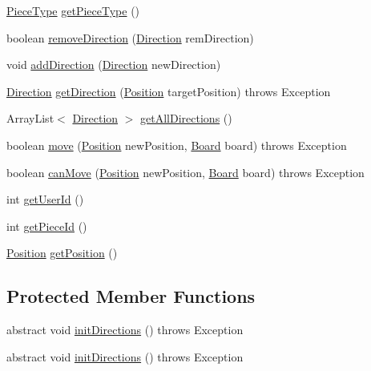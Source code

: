 \begin{DoxyCompactItemize}
\item 
\hyperlink{enumPiece_1_1PieceType}{Piece\-Type} \hyperlink{classPiece_1_1Piece_abe02eb4013ec562dfad1056245088add}{get\-Piece\-Type} ()
\item 
boolean \hyperlink{classPiece_1_1Piece_a472ffe2c12ba2a9d2d4a73e38c3f8d7f}{remove\-Direction} (\hyperlink{classUtil_1_1Direction}{Direction} rem\-Direction)
\item 
void \hyperlink{classPiece_1_1Piece_ab292128370c9df7d112cc7972bb8b1d0}{add\-Direction} (\hyperlink{classUtil_1_1Direction}{Direction} new\-Direction)
\item 
\hyperlink{classUtil_1_1Direction}{Direction} \hyperlink{classPiece_1_1Piece_a4068d2bdf5c732c0eee560df93cea966}{get\-Direction} (\hyperlink{classUtil_1_1Position}{Position} target\-Position)  throws Exception 
\item 
Array\-List$<$ \hyperlink{classUtil_1_1Direction}{Direction} $>$ \hyperlink{classPiece_1_1Piece_aee0dc72aed56d9a5c9612d3a9d545672}{get\-All\-Directions} ()
\item 
boolean \hyperlink{classPiece_1_1Piece_a23a749e9ef159a908cb66ddf8575b4a6}{move} (\hyperlink{classUtil_1_1Position}{Position} new\-Position, \hyperlink{classBoard_1_1Board}{Board} board)  throws Exception 
\item 
boolean \hyperlink{classPiece_1_1Piece_ad6d3c365ebdbee1c5a128d5cb645a5c3}{can\-Move} (\hyperlink{classUtil_1_1Position}{Position} new\-Position, \hyperlink{classBoard_1_1Board}{Board} board)  throws Exception 
\item 
int \hyperlink{classPiece_1_1Piece_a39912c2af6e604892dc897105aa511eb}{get\-User\-Id} ()
\item 
int \hyperlink{classPiece_1_1Piece_abb5dd621ae9e76e2aa622a67bf6219b0}{get\-Piece\-Id} ()
\item 
\hyperlink{classUtil_1_1Position}{Position} \hyperlink{classPiece_1_1Piece_a1aa0fc5fa0e9f96c701f7d3b7145560e}{get\-Position} ()
\end{DoxyCompactItemize}
\subsection*{Protected Member Functions}
\begin{DoxyCompactItemize}
\item 
abstract void \hyperlink{classPiece_1_1Piece_af8bf9c4edb5bd73c91f3f8b21793ca5b}{init\-Directions} ()  throws Exception
\item 
abstract void \hyperlink{classPiece_1_1Piece_af8bf9c4edb5bd73c91f3f8b21793ca5b}{init\-Directions} ()  throws Exception
\end{DoxyCompactItemize}
